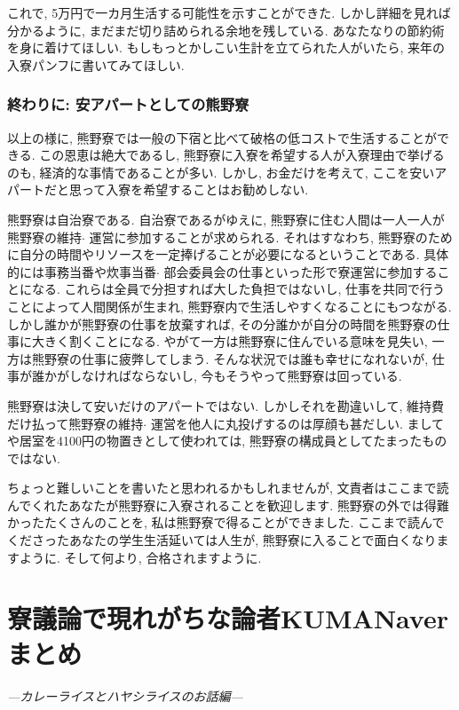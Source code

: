 \documentclass[10pt,b5jsbook,dvips,dvipdfmx,openany]{jsbook}
\theoremstyle{definition}
\begin{document}
	これで, 5万円で一カ月生活する可能性を示すことができた. しかし詳細を見れば分かるように, まだまだ切り詰められる余地を残している. あなたなりの節約術を身に着けてほしい. もしもっとかしこい生計を立てられた人がいたら, 来年の入寮パンフに書いてみてほしい.

			\subsubsection{終わりに: 安アパートとしての熊野寮}
			以上の様に, 熊野寮では一般の下宿と比べて破格の低コストで生活することができる. この恩恵は絶大であるし, 熊野寮に入寮を希望する人が入寮理由で挙げるのも, 経済的な事情であることが多い. しかし, お金だけを考えて, ここを安いアパートだと思って入寮を希望することはお勧めしない.

		熊野寮は自治寮である. 自治寮であるがゆえに, 熊野寮に住む人間は一人一人が熊野寮の維持$ \cdot $ 運営に参加することが求められる. それはすなわち, 熊野寮のために自分の時間やリソースを一定捧げることが必要になるということである. 具体的には事務当番や炊事当番$ \cdot $ 部会委員会の仕事といった形で寮運営に参加することになる. これらは全員で分担すれば大した負担ではないし, 仕事を共同で行うことによって人間関係が生まれ, 熊野寮内で生活しやすくなることにもつながる. しかし誰かが熊野寮の仕事を放棄すれば, その分誰かが自分の時間を熊野寮の仕事に大きく割くことになる. やがて一方は熊野寮に住んでいる意味を見失い, 一方は熊野寮の仕事に疲弊してしまう. そんな状況では誰も幸せになれないが, 仕事が誰かがしなければならないし, 今もそうやって熊野寮は回っている.

		熊野寮は決して安いだけのアパートではない. しかしそれを勘違いして, 維持費だけ払って熊野寮の維持$ \cdot $ 運営を他人に丸投げするのは厚顔も甚だしい. ましてや居室を4100円の物置きとして使われては, 熊野寮の構成員としてたまったものではない.

		ちょっと難しいことを書いたと思われるかもしれませんが, 文責者はここまで読んでくれたあなたが熊野寮に入寮されることを歓迎します. 熊野寮の外では得難かったたくさんのことを, 私は熊野寮で得ることができました. ここまで読んでくださったあなたの学生生活延いては人生が, 熊野寮に入ることで面白くなりますように. そして何より, 合格されますように.





	\section{寮議論で現れがちな論者KUMANaverまとめ} %
	\emph{---カレーライスとハヤシライスのお話編---}
\end{document}
